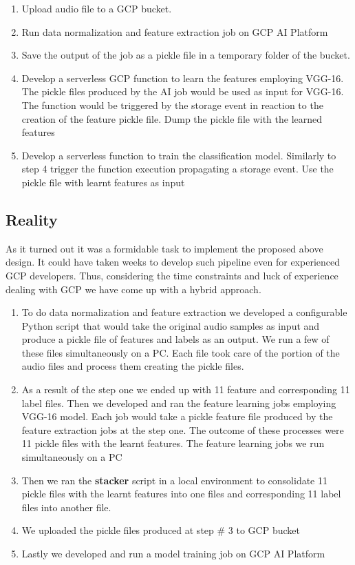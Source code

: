 \begin{enumerate}
\def\labelenumi{\arabic{enumi}.}
\tightlist
\item
  Upload audio file to a GCP bucket.
\item
  Run data normalization and feature extraction job on GCP AI Platform
\item
  Save the output of the job as a pickle file in a temporary folder of
  the bucket.
\item
  Develop a serverless GCP function to learn the features employing
  VGG-16. The pickle files produced by the AI job would be used as input
  for VGG-16. The function would be triggered by the storage event in
  reaction to the creation of the feature pickle file. Dump the pickle
  file with the learned features
\item
  Develop a serverless function to train the classification model.
  Similarly to step 4 trigger the function execution propagating a
  storage event. Use the pickle file with learnt features as input
\end{enumerate}

\hypertarget{reality}{%
\subsection{Reality}\label{reality}}

As it turned out it was a formidable task to implement the proposed
above design. It could have taken weeks to develop such pipeline even
for experienced GCP developers. Thus, considering the time constraints
and luck of experience dealing with GCP we have come up with a hybrid
approach.

\begin{enumerate}
\def\labelenumi{\arabic{enumi}.}
\tightlist
\item
  To do data normalization and feature extraction we developed a
  configurable Python script that would take the original audio samples
  as input and produce a pickle file of features and labels as an
  output. We run a few of these files simultaneously on a PC. Each file
  took care of the portion of the audio files and process them creating
  the pickle files.
\item
  As a result of the step one we ended up with 11 feature and
  corresponding 11 label files. Then we developed and ran the feature
  learning jobs employing VGG-16 model. Each job would take a pickle
  feature file produced by the feature extraction jobs at the step one.
  The outcome of these processes were 11 pickle files with the learnt
  features. The feature learning jobs we run simultaneously on a PC
\item
  Then we ran the \textbf{stacker} script in a local environment to
  consolidate 11 pickle files with the learnt features into one files
  and corresponding 11 label files into another file.
\item
  We uploaded the pickle files produced at step \# 3 to GCP bucket
\item
  Lastly we developed and run a model training job on GCP AI Platform
\end{enumerate}

